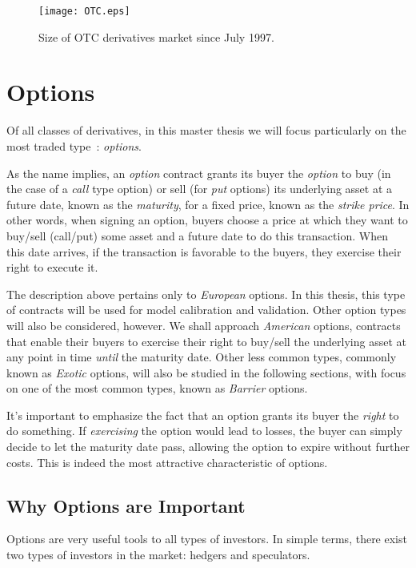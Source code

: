 \begin{figure}[!htb]
    \centering
      \texttt{[image: OTC.eps]}
      \caption{Size of OTC derivatives market since July 1997.}\label{fig:OTC}
    \end{figure}

\section{Options}
\label{section:options}
Of all classes of derivatives, in this master thesis we will focus particularly on the most traded type~\citep{Hull}: \emph{options}.

As the name implies, an \emph{option} contract grants its buyer the \emph{option} to buy (in the case of a \emph{call} type option) or sell (for \emph{put} options) its underlying asset at a future date, known as the \emph{maturity}, for a fixed price, known as the \emph{strike price}.
In other words, when signing an option, buyers choose a price at which they want to buy/sell (call/put) some asset and a future date to do this transaction. When this date arrives, if the transaction is favorable to the buyers, they exercise their right to execute it.

The description above pertains only to \emph{European} options. In this thesis, this type of contracts will be used for model calibration and validation. Other option types will also be considered, however. We shall approach \emph{American} options, contracts that enable their buyers to exercise their right to buy/sell the underlying asset at any point in time \emph{until} the maturity date. Other less common types, commonly known as \emph{Exotic} options, will also be studied in the following sections, with focus on one of the most common types, known as \emph{Barrier} options.



It's important to emphasize the fact that an option grants its buyer the \emph{right} to do something. If \emph{exercising} the option would lead to losses, the buyer can simply decide to let the maturity date pass, allowing the option to expire without further costs. This is indeed the most attractive characteristic of options.



\subsection{Why Options are Important}
\label{subsection:why options are important}
Options are very useful tools to all types of investors. In simple terms, there exist two types of investors in the market: hedgers and speculators.

